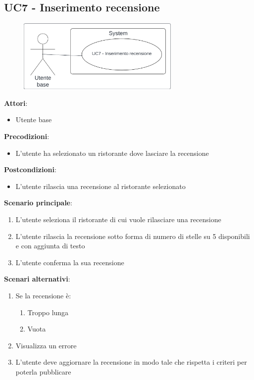 \subsection{UC7 - Inserimento recensione}\label{usecase:7}
\begin{figure}[H]
  \centering
  \includegraphics[width=0.7\textwidth]{ucd/UCD7.png}
\end{figure}
\textbf{Attori}:
\begin{itemize}
    \item Utente base
\end{itemize}
\textbf{Precodizioni}:
\begin{itemize}
    \item L'utente ha selezionato un ristorante dove lasciare la recensione
\end{itemize}
\textbf{Postcondizioni}:
\begin{itemize}
    \item L'utente rilascia una recensione al ristorante selezionato
\end{itemize}
\textbf{Scenario principale}:
\begin{enumerate}
    \item L'utente seleziona il ristorante di cui vuole rilasciare una recensione
    \item L'utente rilascia la recensione sotto forma di numero di stelle su 5 disponibili e con aggiunta di testo
    \item L'utente conferma la sua recensione
\end{enumerate}
\textbf{Scenari alternativi}:
\begin{enumerate}
    \item Se la recensione è:
    \begin{enumerate}
        \item Troppo lunga
        \item Vuota
    \end{enumerate}
    \item Visualizza un errore
    \item L'utente deve aggiornare la recensione in modo tale che rispetta i criteri per poterla pubblicare
\end{enumerate}
\newpage
